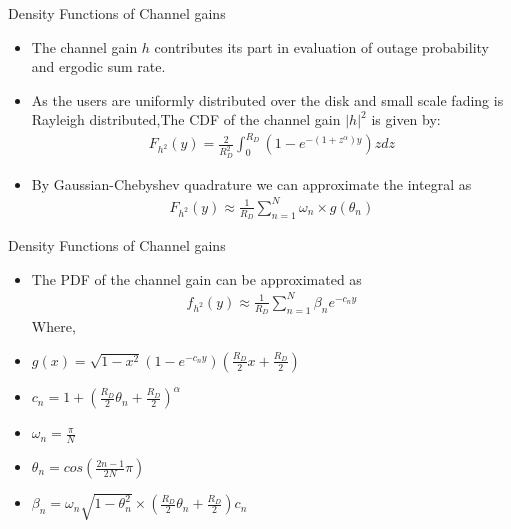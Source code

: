 \documentclass{beamer}
\providecommand{\brak}[1]{\ensuremath{\left(#1\right)}}
\providecommand{\abs}[1]{\vert#1\vert}
\begin{document}
    \begin{frame}{}
\begin{block}{Density Functions of Channel gains}
\begin{itemize}
  \item The channel gain $h$ contributes its part in evaluation of outage probability and ergodic sum rate.
  \item As the users are uniformly distributed over the disk and small scale fading is Rayleigh distributed,The CDF of the channel gain $\abs{h}^2$ is given by:
  \begin{align}
      F_{h^2} (y)= \frac{2}{R_{D}^2} \int_{0}^{R_D} \brak{1-e^{-(1+z^\alpha)y}} z dz 
  \end{align}
  \item By Gaussian-Chebyshev quadrature we can approximate the integral as 
  \begin{align}
      F_{h^2} (y) \approx \frac{1}{R_D} \sum_{n=1}^{N} \omega_{n} \times  g(\theta_{n})
  \end{align}
  \end{itemize}
  \end{block}
  \end{frame}
  \begin{frame}{}
  \begin{block}{Density Functions of Channel gains}
  \begin{itemize}
  \item The PDF of the channel gain can be approximated as 
  \begin{align}
      f_{h^2} (y) \approx \frac{1}{R_D} \sum_{n=1}^{N} \beta_{n} e^{-c_n y}
  \end{align}
  Where,
  \item $g(x)=\sqrt{1-x^2}(1-e^{-c_n y})(\frac{R_D}{2} x+\frac{R_D}{2})$
  \item $c_n=1+\brak{\frac{R_D}{2}\theta_n+\frac{R_D}{2}}^\alpha$
  \item $\omega _n=\frac{\pi}{N}$
  \item $\theta_n=cos(\frac{2n-1}{2N}\pi)$
  \item $\beta_n=\omega_n\sqrt{1-\theta_n^2}\times(\frac{R_D}{2}\theta_n+\frac{R_D}{2})c_n$
  \end{itemize}
   \end{block}
    \end{frame}
\end{document}
